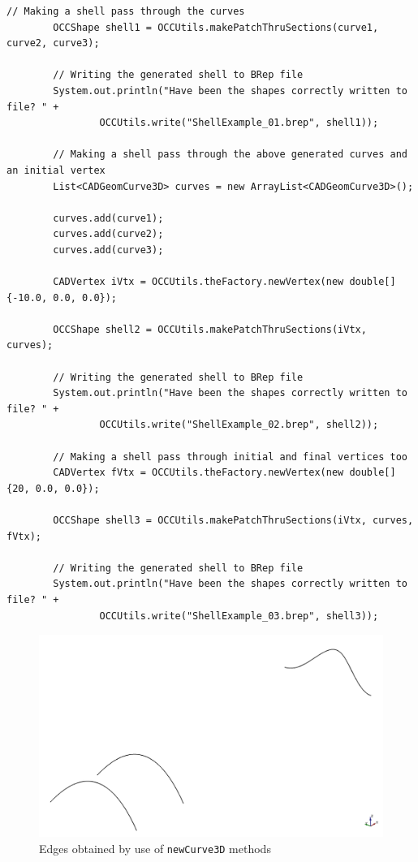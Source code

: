 %
\bigskip
\begin{lstlisting}[caption={Lofts creation by use of \lstinline!makePatchThruSections! methods}, captionpos=b, tabsize=2, label={lst:Example3}]	
		// Making a shell pass through the curves
		OCCShape shell1 = OCCUtils.makePatchThruSections(curve1, curve2, curve3);
		
		// Writing the generated shell to BRep file
		System.out.println("Have been the shapes correctly written to file? " + 
				OCCUtils.write("ShellExample_01.brep", shell1));
					
		// Making a shell pass through the above generated curves and an initial vertex
		List<CADGeomCurve3D> curves = new ArrayList<CADGeomCurve3D>();
		
		curves.add(curve1);
		curves.add(curve2);
		curves.add(curve3);
		
		CADVertex iVtx = OCCUtils.theFactory.newVertex(new double[] {-10.0, 0.0, 0.0});
		
		OCCShape shell2 = OCCUtils.makePatchThruSections(iVtx, curves);
		
		// Writing the generated shell to BRep file
		System.out.println("Have been the shapes correctly written to file? " + 
				OCCUtils.write("ShellExample_02.brep", shell2));
		
		// Making a shell pass through initial and final vertices too
		CADVertex fVtx = OCCUtils.theFactory.newVertex(new double[] {20, 0.0, 0.0});

		OCCShape shell3 = OCCUtils.makePatchThruSections(iVtx, curves, fVtx);

		// Writing the generated shell to BRep file
		System.out.println("Have been the shapes correctly written to file? " + 
				OCCUtils.write("ShellExample_03.brep", shell3));		
\end{lstlisting}
%
\begin{figure}[!ht]
\centering
\includegraphics[scale=0.5]{Immagini/Capitolo2/EdgeExample2}
\caption{Edges obtained by use of \lstinline[language=Java]!newCurve3D! methods}
\label{fig:EdgeExample}
\end{figure}
